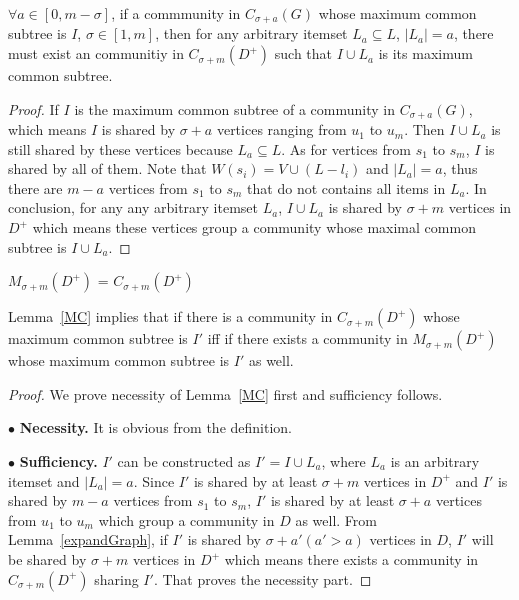 \begin{lemma}
\label{expandGraph}
$\forall a \in [0,m-\sigma]$, if a commmunity in $C_{\sigma +a}(G)$ whose maximum common subtree is $I$, $\sigma \in [1,m]$, then for any arbitrary itemset $L_a \subseteq L$, $|L_a|=a$, there must exist an communitiy in $C_{\sigma +m}(D^+)$ such that $I \cup L_a$ is its maximum common subtree. 
\end{lemma}  

\begin{proof}
If $I$ is the maximum common subtree of a community in $C_{\sigma +a}(G)$, which means $I$ is shared by $\sigma +a$ vertices ranging from $u_1$ to $u_m$. Then $I \cup L_a$ is still shared by these vertices because $L_a \subseteq L$. As for vertices from $s_1$ to $s_m$, $I$ is shared by all of them. Note that $W(s_i)=V \cup (L-{l_i})$ and $|L_a|=a$, thus there are $m-a$ vertices from $s_1$ to $s_m$ that do not contains all items in $L_a$. In conclusion, for any any arbitrary itemset $L_a$, $I \cup L_a$ is shared by $\sigma +m$ vertices in $D^+$ which means these vertices group a community whose maximal common subtree is $I \cup L_a$.
\end{proof}

\begin{lemma}
\label{MC}
$M_{\sigma +m}(D^+)$ = $C_{\sigma +m}(D^+)$
\end{lemma}

Lemma~\ref{MC} implies that if there is a community in $C_{\sigma +m}(D^+)$ whose maximum common subtree is $I'$ iff if there exists a community in $M_{\sigma +m}(D^+)$ whose maximum common subtree is $I'$ as well. 

\begin{proof}
We prove necessity of Lemma~\ref{MC} first and sufficiency follows.

$\bullet$ \textbf{Necessity.} It is obvious from the definition.

$\bullet$ \textbf{Sufficiency.} $I'$ can be constructed as $I'= I \cup L_a$, where $L_a$ is an arbitrary itemset and $|L_a|=a$. Since $I'$ is shared by at least $\sigma +m$ vertices in $D^+$ and $I'$ is shared by $m-a$ vertices from $s_1$ to $s_m$, $I'$ is shared by at least $\sigma+a$ vertices from $u_1$ to $u_m$ which group a community in $D$ as well. From Lemma~\ref{expandGraph}, if $I'$ is shared by $\sigma+a' (a'>a)$ vertices in $D$, $I'$ will be shared by $\sigma+m$ vertices in $D^+$ which means there exists a community in $C_{\sigma +m}(D^+)$ sharing $I'$. That proves the necessity part. 
\end{proof}

